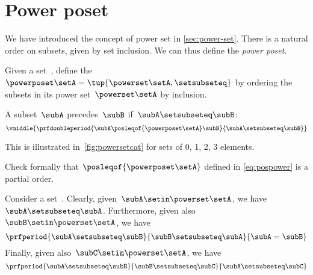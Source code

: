 
\section{Power poset}

We have introduced the concept of power set in \cref{sec:power-set}.
There is a natural order on subsets, given by set inclusion.
We can thus define the \emph{power poset}.

\begin{definition}
    \label{def:power-poset}
    Given a set~\setA, define the ~$\powerposet\setA = \tup{\powerset\setA, {{\setsubseteq}}}$ by ordering the subsets in its power set~$\powerset\setA$ by inclusion.

    A subset~$\subA$ precedes~$\subB$ if~$\subA \setsubseteq \subB$:
    \begin{equation} \label{eq:pospower}
        \vmiddle{
            \prfdoubleperiod{
                \subA \posleqof{\powerposet\setA} \subB
            }{
                \subA \setsubseteq \subB
            }
        }
    \end{equation}
\end{definition}
This is illustrated in~\cref{fig:powersetcat} for sets of 0, 1, 2, 3 elements.
\begin{exercise}
    Check formally that $\posleqof{\powerposet\setA}$ defined in \cref{eq:pospower} is a partial order.
\end{exercise}
\begin{solution}
    Consider a set~\setA.
    Clearly, given~$\subA\setin \powerset \setA$, we have~$\subA\setsubseteq \subA$.
    Furthermore, given also~$\subB\setin \powerset \setA$, we have
    \begin{equation}\label{eq:ex-pospower-1}
        \prfperiod{
            \subA\setsubseteq \subB
        }{
            \subB\setsubseteq \subA
        }{
            \subA=\subB
        }
    \end{equation}
    Finally, given also~$\subC\setin \powerset \setA$, we have
    \begin{equation}\label{eq:ex-pospower-2}
        \prfperiod{
            \subA\setsubseteq \subB
        }{
            \subB\setsubseteq \subC
        }{
            \subA\setsubseteq\subC
        }
    \end{equation}
\end{solution}
\vfill
\begin{figure*}[h]
    \centering
    \hfill
    \hfill
    \hfill
    \caption{Power set as a poset.
    }
    \label{fig:powersetcat}
\end{figure*}
\vfill
